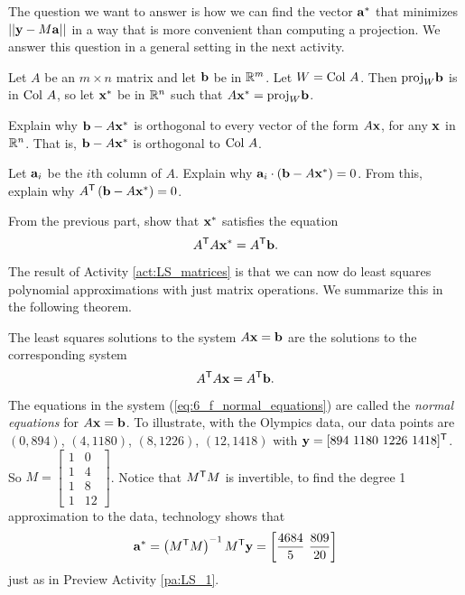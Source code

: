 The question we want to  answer is how we can find the vector $\mathbf{a}^*$ that minimizes $||\mathbf{y} -M\mathbf{a}||$ in a way that is more convenient than computing a projection. We answer this question in a general setting in the next activity. 

\begin{activity} \label{act:LS_matrices} Let $A$ be an $m \times n$ matrix and let $\mathbf{b}$ be in $\mathbb{R}^m$. Let $W = \text{Col } A$. Then $\text{proj}_W \mathbf{b}$ is in $\text{Col } A$, so let $\mathbf{x}^*$ be in $\mathbb{R}^{n}$ such that $A\mathbf{x}^* = \text{proj}_W \mathbf{b}$. 
	\ba
    \item Explain why $\mathbf{b} - A\mathbf{x}^*$ is orthogonal to every vector of the form $A\mathbf{x}$, for any $\mathbf{x}$ in $\mathbb{R}^{n}$. That is, $\mathbf{b} - A\mathbf{x}^*$ is orthogonal to $\text{Col } A$. 

    \item Let $\mathbf{a}_i$ be the $i$th column of $A$. Explain why $\mathbf{a}_i \cdot \left(\mathbf{b} - A\mathbf{x}^*\right) = 0$. From this, explain why $A^{\mathsf{T}}\left(\mathbf{b} - A\mathbf{x}^*\right) = 0$. 
    
    \item From the previous part, show that $\mathbf{x}^*$ satisfies the equation
\[A^{\mathsf{T}}A\mathbf{x}^* = A^{\mathsf{T}}\mathbf{b}.\]


    \ea
    
\end{activity}


The result of Activity \ref{act:LS_matrices} is that we can now do least squares polynomial approximations with just matrix operations. We summarize this in the following theorem.

\begin{theorem} \label{thm:6_f_least_squares_1} The least squares solutions to the system $A \mathbf{x} = \mathbf{b}$ are the solutions to the corresponding system 
    \begin{equation} \label{eq:6_f_normal_equations}
    A^{\mathsf{T}}A\mathbf{x} = A^{\mathsf{T}}\mathbf{b}.
    \end{equation}
\end{theorem}

The equations in the system (\ref{eq:6_f_normal_equations}) are called the \emph{normal equations} for $A \mathbf{x} = \mathbf{b}$. To illustrate, with the Olympics data, our data points are $(0, 894)$, $(4, 1180)$, $(8, 1226)$, $(12,1418)$ with $\vy = [894 \ 1180 \ 1226 \ 1418]^{\tr}$. So $M = \left[ \begin{array}{cc} 1&0 \\ 1&4 \\ 1&8 \\ 1&12 \end{array} \right]$. Notice that $M^{\mathsf{T}}M$ is invertible, to find the degree 1 approximation to the data, technology shows that 
\[\va^* = \left(M^{\tr}M\right)^{-1}M^{\tr}\vy = \left[ \frac{4684}{5} \ \frac{809}{20}\right]\]
just as in Preview Activity \ref{pa:LS_1}. 


